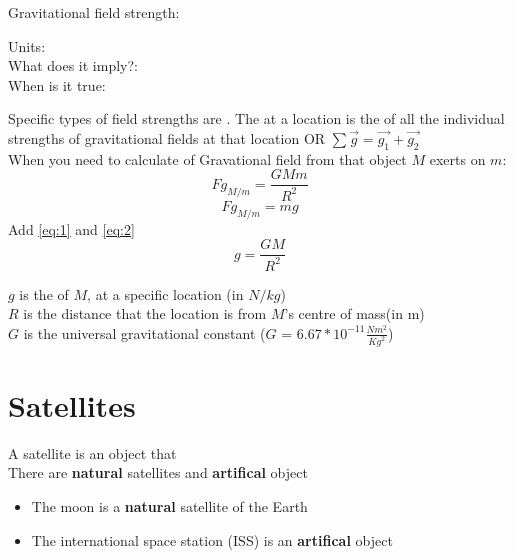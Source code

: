 Gravitational field strength:
\begin{center}
    Units: \\
    What does it imply?:  \\
    When is it true: 
\end{center}

Specific types of field strengths are . The  at a location is the 
of all the individual strengths of gravitational fields at that location OR $\sum \vec{g} = \vec{g_{1}} + \vec{g_{2}}$\\

When you need to calculate  of Gravational field from that object $M$ exerts on $m$:
\begin{equation} \label{eq:1}
    Fg_{M/m} = \frac{GMm}{R^2}
\end{equation}
\begin{equation} \label{eq:2}
    Fg_{M/m} = mg
\end{equation}
Add \ref{eq:1} and \ref{eq:2}
\begin{equation}
    g = \frac{GM}{R^2}
\end{equation}
\begin{center}
    $g$ is the  of $M$, at a specific location (in $N/kg$)\\
    $R$ is the distance that the location is from $M$'s centre of mass(in m)\\
    $G$ is the universal gravitational constant ($G$ = $6.67*10^{-11}\frac{Nm^2}{Kg^2}$)
\end{center}

\newpage
\section{Satellites}
A satellite is an object that \\

There are \textbf{natural} satellites and \textbf{artifical} object
\begin{itemize}
    \item The moon is a \textbf{natural} satellite of the Earth
    \item The international space station (ISS) is an \textbf{artifical} object
\end{itemize}

